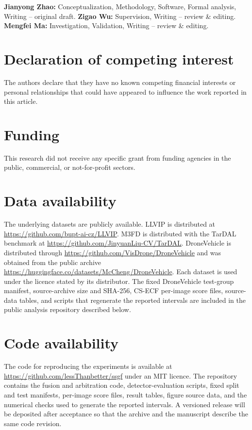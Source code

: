 \documentclass[preprint,11pt]{elsarticle}
\begin{document}
\textbf{Jianyong Zhao:} Conceptualization, Methodology, Software, Formal
analysis, Writing -- original draft. \textbf{Zigao Wu:} Supervision, Writing
-- review \& editing. \textbf{Mengfei Ma:} Investigation, Validation,
Writing -- review \& editing.

\section*{Declaration of competing interest}

The authors declare that they have no known competing financial interests or
personal relationships that could have appeared to influence the work reported
in this article.

\section*{Funding}

This research did not receive any specific grant from funding agencies in the
public, commercial, or not-for-profit sectors.

\section*{Data availability}

The underlying datasets are publicly available. LLVIP is distributed at
\url{https://github.com/bupt-ai-cz/LLVIP}. M3FD is distributed with the TarDAL
benchmark at \url{https://github.com/JinyuanLiu-CV/TarDAL}. DroneVehicle is
distributed through \url{https://github.com/VisDrone/DroneVehicle} and was
obtained from the public archive
\url{https://huggingface.co/datasets/McCheng/DroneVehicle}. Each dataset is used
under the licence stated by its distributor. The fixed DroneVehicle test-group
manifest, source-archive size and SHA-256, CS-ECF per-image score files,
source-data tables, and scripts that regenerate the reported intervals are
included in the public analysis repository described below.

\section*{Code availability}

The code for reproducing the experiments is available at
\url{https://github.com/lessThanbetter/ssgf} under an MIT licence. The repository
contains the fusion and arbitration code, detector-evaluation scripts, fixed
split and test manifests, per-image score files, result tables, figure source
data, and the numerical checks used to generate the reported intervals. A
versioned release will be deposited after acceptance so that the archive and
the manuscript describe the same code revision.
\end{document}
